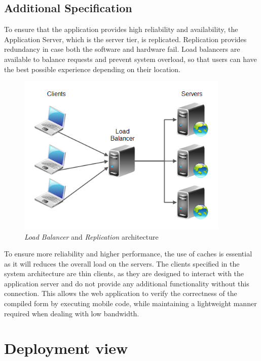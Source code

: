 \documentclass[12pt]{report}
\begin{document}
\clearpage
\subsection{Additional Specification}
To ensure that the application provides high reliability and availability, the Application Server, which is the server tier, is replicated. Replication provides redundancy in case both the software and hardware fail. Load balancers are available to balance requests and prevent system overload, so that users can have the best possible experience depending on their location.

\begin{figure}[ht]
    \centering
    \includegraphics[width = 0.9\textwidth]{assets/load_balancers_and_replication.png}
    \caption{\emph{Load Balancer} and \emph{Replication} architecture}
    \label{fig:my_label1}
\end{figure}

\noindent To ensure more reliability and higher performance, the use of caches is essential as it will reduces the overall load on the servers.
The clients specified in the system architecture are thin clients, as they are designed to interact with the application server and do not provide any additional functionality without this connection. This allows the web application to verify the correctness of the compiled form by executing mobile code, while maintaining a lightweight manner required when dealing with low bandwidth.

\newpage
\section{Deployment view}
\end{document}
